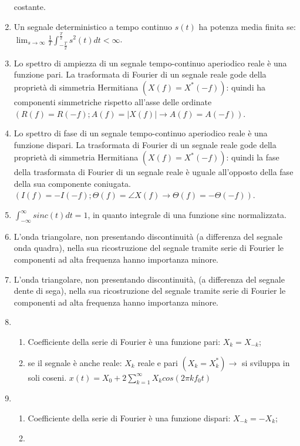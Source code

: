 \documentclass[12pt
]{article}
\providecommand{\tightlist}{%
  \setlength{\itemsep}{0pt}\setlength{\parskip}{0pt}}
\begin{document}
\begin{enumerate}
	costante.
	\item
	Un segnale deterministico a tempo continuo \(s(t)\) ha potenza media
	finita se: \newline $ \displaystyle \lim_{s\to\infty} \frac{1}{T} \int_{-\frac{T}{2}}^{\frac{T}{2}} s^2(t)dt < \infty$.
	\item
	Lo spettro di ampiezza di un segnale tempo-continuo aperiodico reale è una funzione pari. La trasformata di Fourier di un segnale reale gode della proprietà di simmetria Hermitiana $(X(f) = X^*(-f))$: quindi ha componenti simmetriche rispetto all'asse delle ordinate $(R(f)=R(-f); A(f)=|X(f)| \to A(f)=A(-f))$.
	\item
	Lo spettro di fase di un segnale tempo-continuo aperiodico reale è una	funzione dispari.  La trasformata di Fourier di un segnale reale gode della proprietà di simmetria Hermitiana $(X(f) = X^*(-f))$: quindi la fase della trasformata di Fourier di un segnale reale è uguale all'opposto della fase della sua componente coniugata.
	$(I(f)=-I(-f); \Theta(f)=\angle X(f) \to \Theta(f)=-\Theta(-f))$.
	\item
	$ \displaystyle \int_{-\infty}^\infty sinc(t)dt = 1$, in quanto integrale di una
	funzione sinc normalizzata.
	\item
	L'onda triangolare, non presentando discontinuità (a differenza del segnale onda quadra), nella sua ricostruzione del segnale tramite serie di Fourier le componenti ad alta frequenza hanno importanza minore.
	\item
L'onda triangolare, non presentando discontinuità, (a differenza del segnale dente di sega), nella sua ricostruzione del segnale tramite serie di Fourier le componenti ad alta frequenza hanno importanza minore.
	\item
	\begin{enumerate}
		\tightlist
			\item 
			Coefficiente della serie di Fourier  è una funzione pari: $X_k = X_{-k}$;
			\item 
			se il segnale è anche reale: $X_k$ reale e pari $(X_k = X^*_k) \to $ si sviluppa in soli coseni.\newline
			$ \displaystyle x(t)= X_0 + 2 \sum_{k=1}^{\infty} X_k cos (2\pi k f_0 t)$
	\end{enumerate}
	\item
	\begin{enumerate}
		\tightlist
		\item 
		Coefficiente della serie di Fourier è una funzione dispari: $X_{-k} = -X_{k}$;
		\item 

\end{enumerate}
\end{enumerate}
\end{document}
